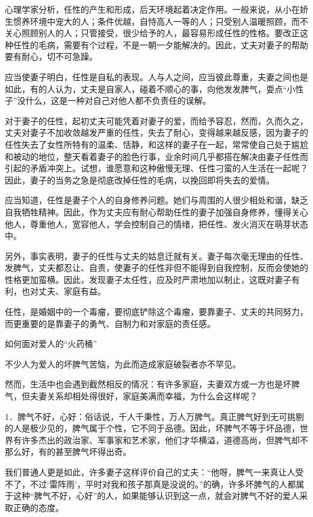 \documentclass[12pt,UTF8,openany]{ctexbook}
\begin{document}
心理学家分析，任性的产生和形成，后天环境起着决定作用。一般来说，从小在娇生惯养环境中宠大的人；条件优越，自恃高人一等的人；只受别人温暖照顾，而不关心照顾别人的人；只管接受，很少给予的人，最容易形成任性的性格。要改正这种任性的毛病，需要有个过程，不是一朝一夕能解决的。因此，丈夫对妻子的帮助要有耐心，切不可急躁。

应当使妻子明白，任性是自私的表现。人与人之间，应当彼此尊重，夫妻之间也是如此，有的人认为，丈夫是自家人，碰着不顺心的事，向他发发脾气，耍点“小性子”没什么，这是一种对自己对他人都不负责任的误解。

对于妻子的任性，起初丈夫可能凭着对妻子的爱，而给予容忍，然而，久而久之，丈夫对妻子不加收敛越发严重的任性，失去了耐心，变得越来越反感，因为妻子的任性失去了女性所特有的温柔、恬静，和这样的妻子在一起，常常使自己处于尴尬和被动的地位，整天看着妻子的脸色行事，业余时间几乎都搭在解决由妻子任性而引起的矛盾冲突上。试想，谁愿意和这种傲慢无理、任性刁蛮的人生活在一起呢？因此，妻子的当务之急是彻底改掉任性的毛病，以挽回即将失去的爱情。

应当知道，任性是妻子个人的自身修养问题。她们与周围的人很少相处和谐，缺乏自我牺牲精神。因此，作为丈夫应有耐心帮助任性的妻子加强自身修养，懂得关心他人，尊重他人，宽容他人，学会控制自己的情绪，把任性、发火消灭在萌芽状态中。

另外，事实表明，妻子的任性与丈夫的姑息迁就有关。妻子每次毫无理由的任性、发脾气，丈夫都忍让、自责，使妻子的任性非但不能得到自我控制，反而会使她的性格更加蛮横。因此，发现妻子太任性，应及时严肃地加以制止，这既对妻子有利，也对丈夫、家庭有益。

任性，是婚姻中的一个毒瘤，要彻底铲除这个毒瘤，要靠妻子、丈夫的共同努力，而更重要的是靠妻子的勇气、自制力和对家庭的责任感。





如何面对爱人的“火药桶”


不少人为爱人的坏脾气苦恼，为此而造成家庭破裂者亦不罕见。

然而，生活中也会遇到截然相反的情况：有许多家庭，夫妻双方或一方也是坏脾气，但夫妻关系却相处得很好，家庭美满而幸福，为什么会这样呢？

1．脾气不好，心好：俗话说，千人千秉性，万人万脾气。真正脾气好到无可挑剔的人是极少见的，脾气属于个性，它不同于品德。因此，坏脾气不等于坏品德，世界有许多杰出的政治家、军事家和艺术家，他们才华横溢，道德高尚，但脾气却不那么好，有的甚至脾气坏得出奇。

我们普通人更是如此，许多妻子这样评价自己的丈夫：“他呀，脾气一来真让人受不了，不过‘雷阵雨’，平时对我和孩子那真是没说的。”的确，许多坏脾气的人都属于这种“脾气不好，心好”的人，如果能够认识到这一点，就会对脾气不好的爱人采取正确的态度。
\end{document}
